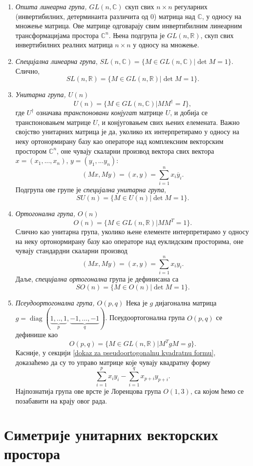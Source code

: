 \documentclass{report}
\theoremstyle{plain}
\theoremstyle{definition}
\begin{document}
\begin{enumerate}
  \item \emph{Општа линеарна група, $GL(n, \mathbb{C})$} скуп свих $n\times n$ регуларних (инвертибилних, детерминанта различита од 0) матрица над $\mathbb{C}$, у односу на множење матрица. Ове матрице одговарају свим инвертибилним линеарним трансформацијама простора $\mathbb{C}^n$. Њена подгрупа је $GL(n, \mathbb{R})$, скуп свих инвертибилних реалних матрица $n\times n$ у односу на множење.
  \item \emph{Специјална линеарна група}, $SL(n, \mathbb{C}) = \{M\in GL(n, \mathbb{C})|\det M = 1\}$. Слично,
  $$SL(n, \mathbb{R}) = \{M\in GL(n, \mathbb{R})|\det M = 1\}.$$
  \item \emph{Унитарна група, $U(n)$}
  $$U(n) = \{M\in GL(n, \mathbb{C})|MM^\dag = I\},$$
  где $U^\dag$ означава \emph{транспоновани конјугат} матрице $U$, и добија се транспоновањем матрице $U$, и конјуговањем свих њених елемената. Важно својство унитарних матрица је да, уколико их интерпретирамо у односу на неку ортонормирану базу као операторе над комплексним векторским простором $\mathbb{C}^n$, оне чувају скаларни производ вектора свих вектора $x = (x_1, ..., x_n)$, $y = (y_1, ...y_n)$:
  $$(Mx, My) = (x, y) = \sum_{i=1}^n x_i \overline{y}_i.$$
  Подгрупа ове групе је \emph{специјална унитарна група},
  $$SU(n) = \{M\in U(n)|\det M = 1\}.$$
  \item \emph{Ортогонална група, $O(n)$}
  $$O(n) = \{M\in GL(n, \mathbb{R})|MM^T = 1\}.$$
  Слично као унитарна група, уколико њене елементе интерпретирамо у односу на неку ортонормирану базу као операторе над еуклидским просторима, оне чувају стандардни скаларни производ
  $$(Mx, My) = (x, y) = \sum_{i=1}^n x_i y_i.$$
  Даље, \emph{специјална ортогонална} група је дефинисана са
  $$SO(n) = \{M\in O(n)|\det M = 1\}.$$
  \item \emph{Псеудоортогонална група, $O(p, q)$} Нека је $g$ дијагонална матрица $g = \operatorname{diag}(\underbrace{1, .., 1}_p, \underbrace{-1, ..., -1}_q)$. Псеудоортогонална група $O(p, q)$ се дефинише као
      $$O(p, q) = \{M\in GL(n, \mathbb{R})|M^TgM = g\}.$$
      Касније, у секцији \ref{dokaz za pseudoortogonalnu kvadratnu formu}, доказаћемо да су то управо матрице које чувају квадратну форму
      $$\sum_{i=1}^p x_iy_i - \sum_{i=1}^q x_{p+i}y_{p+i}.$$
  Најпознатија група ове врсте је Лоренцова група $O(1, 3)$, са којом ћемо се позабавити на крају овог рада.
\end{enumerate}

\section{Симетрије унитарних векторских простора}
\label{simetrije unitarnih prostora}
\end{document}
